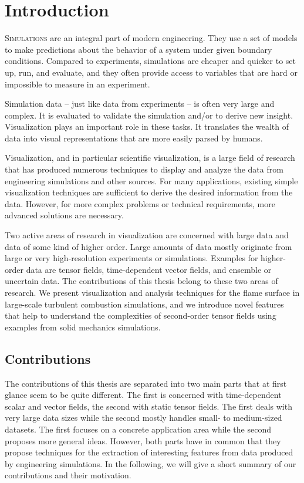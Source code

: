 \chapter{Introduction} %
\label{cha:introduction}
%
\vspace{-\baselineskip}%
\lettrine[findent=-3.5pt, nindent=4pt, loversize=0.015,
lhang=0.08]{S}{imulations} are an integral part of modern engineering.
%
They use a set of models to make predictions about the behavior of a system
under given boundary conditions.
%
Compared to experiments, simulations are cheaper and quicker to set up, run, and
evaluate, and they often provide access to variables that are hard or impossible
to measure in an experiment.
%

%
Simulation data -- just like data from experiments -- is often very large and
complex.
%
It is evaluated to validate the simulation and/or to derive new insight.
%
Visualization plays an important role in these tasks.
%
It translates the wealth of data into visual representations that are more
easily parsed by humans.
%

%
Visualization, and in particular scientific visualization, is a large field of
research that has produced numerous techniques to display and analyze the data
from engineering simulations and other sources.
%
For many applications, existing simple visualization techniques are sufficient
to derive the desired information from the data.
%
However, for more complex problems or technical requirements, more advanced
solutions are necessary.
%

%
Two active areas of research in visualization are concerned with large data and
data of some kind of higher order.
%
Large amounts of data mostly originate from large or very high-resolution
experiments or simulations.
%
Examples for higher-order data are tensor fields, time-dependent vector fields,
and ensemble or uncertain data.
%
The contributions of this thesis belong to these two areas of research.
%
We present visualization and analysis techniques for the flame surface in
large-scale turbulent combustion simulations, and we introduce novel features
that help to understand the complexities of second-order tensor fields using
examples from solid mechanics simulations.
%
\section{Contributions} %
\label{sec:contributions}
%
The contributions of this thesis are separated into two main parts that at first
glance seem to be quite different.
%
The first is concerned with time-dependent scalar and vector fields, the second
with static tensor fields.
%
The first deals with very large data sizes while the second mostly handles
small- to medium-sized datasets.
%
The first focuses on a concrete application area while the second proposes more
general ideas.
%
However, both parts have in common that they propose techniques for the
extraction of interesting features from data produced by engineering
simulations.
%
In the following, we will give a short summary of our contributions and their
motivation.
%
